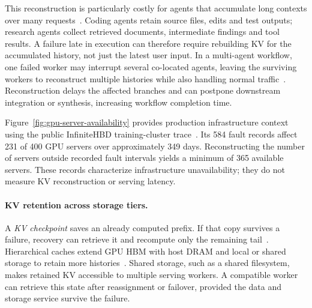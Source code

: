 This reconstruction is particularly costly for agents that accumulate
long contexts over many requests~\cite{jayakody2026ghostserve}.
Coding agents retain source files, edits and test outputs; research
agents collect retrieved documents, intermediate findings and tool
results. A failure late in execution can therefore require rebuilding
KV for the accumulated history, not just the latest user input.
In a multi-agent workflow, one failed worker may interrupt several
co-located agents, leaving the surviving workers to reconstruct multiple
histories while also handling normal traffic~\cite{cao2026lumen}.
Reconstruction delays the affected branches and can postpone downstream
integration or synthesis, increasing workflow completion time.

Figure~\ref{fig:gpu-server-availability} provides production infrastructure
context using the public InfiniteHBD training-cluster
trace~\cite{shou2025infinitehbd}. Its 584 fault records affect 231 of
400 GPU servers over approximately 349 days. Reconstructing the number
of servers outside recorded fault intervals yields a minimum of 365
available servers. These records characterize infrastructure
unavailability; they do not measure KV reconstruction or serving latency.

\paragraph{KV retention across storage tiers.}
A \emph{KV checkpoint} saves an already computed prefix. If that copy
survives a failure, recovery can retrieve it and recompute only the
remaining tail~\cite{strati2024dejavu,jayakody2026ghostserve}.
Hierarchical caches extend GPU HBM with host DRAM and local or shared
storage to retain more histories~\cite{gao2024cachedattention,qin2025mooncake}.
Shared storage, such as a shared filesystem, makes retained KV accessible
to multiple serving workers. A compatible worker can retrieve this state
after reassignment or failover, provided the data and storage service
survive the failure.
